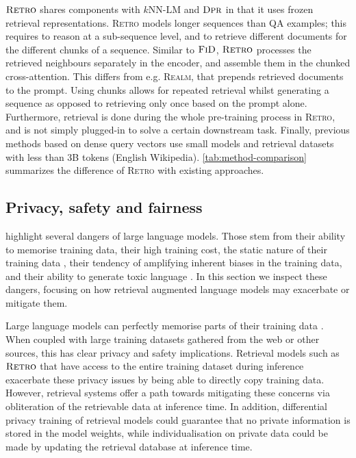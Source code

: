 $\textsc{Retro}$ shares components with $k\textrm{NN-LM}$ and $\textsc{Dpr}$ in that it uses frozen retrieval representations.
\textsc{Retro} models longer sequences than QA examples; this requires to reason at a sub-sequence level, and to retrieve different documents for the different chunks of a sequence. Similar to $\textsc{FiD}$, $\textsc{Retro}$ processes the retrieved neighbours separately in the encoder, and assemble them in the chunked cross-attention. This differs from e.g. \textsc{Realm}, that prepends retrieved documents to the prompt. Using chunks allows for repeated retrieval whilst generating a sequence as opposed to retrieving only once based on the prompt alone. Furthermore, retrieval is done during the whole pre-training process in \textsc{Retro}, and is not simply plugged-in to solve a certain downstream task. Finally, previous methods based on dense query vectors use small models and retrieval datasets with less than 3B tokens (English Wikipedia). \autoref{tab:method-comparison} summarizes the difference of \textsc{Retro} with existing approaches.

\subsection{Privacy, safety and fairness}

\citet{bender2021dangers, weidinger2021harms} highlight several dangers of large language models. Those stem from their ability to memorise training data, their high training cost, the static nature of their training data \citep{lazaridou2021pitfalls}, their tendency of amplifying inherent biases in the training data, and their ability to generate toxic language \citep{gehman2020realtoxicityprompts}. In this section we inspect these dangers, focusing on how retrieval augmented language models may exacerbate or mitigate them.

Large language models can perfectly memorise parts of their training data \citep{carlini2021extracting}. When coupled with large training datasets gathered from the web or other sources, this has clear privacy and safety implications. Retrieval models such as $\textsc{Retro}$ that have access to the entire training dataset during inference exacerbate these privacy issues by being able to directly copy training data. However, retrieval systems offer a path towards mitigating these concerns via obliteration of the retrievable data at inference time. In addition, differential privacy training \citep{abadi2016differentialprivacy} of retrieval models could guarantee that no private information is stored in the model weights, while individualisation on private data could be made by updating the retrieval database at inference time.

